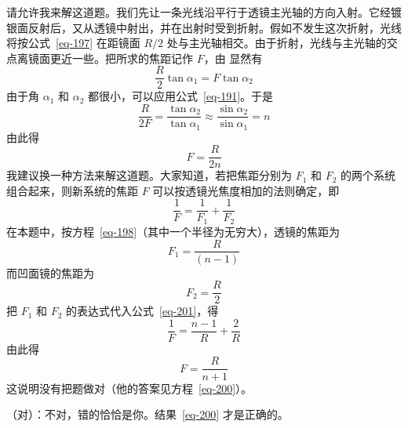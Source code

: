 \begin{dialogue}
\vspace{-20pt}
\stda 请允许我来解这道题。我们先让一条光线沿平行于透镜主光轴的方向入射。它经镀银面反射后，又从透镜中射出，并在出射时受到折射。假如不发生这次折射，光线将按公式~\eqref{eq-197} 在距镜面 $R/2$ 处与主光轴相交。由于折射，光线与主光轴的交点离镜面更近一些。把所求的焦距记作 $F$，由 显然有
\begin{equation*}%
\frac{R}{2} \tan \alpha_{1} = F \tan \alpha_{2}
\end{equation*}
由于角 $\alpha_{1}$ 和 $\alpha_{2}$ 都很小，可以应用公式~\eqref{eq-191}。于是
\begin{equation*}%
\frac{R}{2F} = \frac{\tan \alpha_{2}}{\tan \alpha_{1}} \approx \frac{\sin \alpha_{2}}{ \sin \alpha_{1}} = n
\end{equation*}%
由此得
\begin{equation}
F = \frac{R}{2n}
\label{eq-200}
\end{equation}
\stdb 我建议换一种方法来解这道题。大家知道，若把焦距分别为 $F_{1}$ 和 $F_{2}$ 的两个系统组合起来，则新系统的焦距 $F$ 可以按透镜光焦度相加的法则确定，即
\begin{equation}%
\frac{1}{F} = \frac{1}{F_{1}}+\frac{1}{F_{2}}
\label{eq-201}
\end{equation}
在本题中，按方程~\eqref{eq-198}（其中一个半径为无穷大），透镜的焦距为
\begin{equation*}%
F_{1} = \frac{R}{ (n-1)}
\end{equation*}
而凹面镜的焦距为
\begin{equation*}%
F_{2} = \frac{R}{2}
\end{equation*}
把 $F_{1}$ 和 $F_{2}$ 的表达式代入公式~\eqref{eq-201}，得
\begin{equation}
\frac{1}{F} = \frac{n-1}{R} + \frac{2}{R}
\label{eq-202}
\end{equation}
由此得
\begin{equation}
F = \frac{R}{n+1}
\label{eq-203}
\end{equation}
这说明没有把题做对（他的答案见方程~\eqref{eq-200}）。

\tchr （对）：不对，错的恰恰是你。结果~\eqref{eq-200} 才是正确的。


\end{dialogue}
